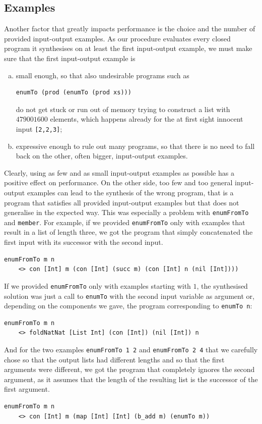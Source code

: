 \subsection{Examples}
Another factor that greatly impacts performance is the choice and the number of provided input-output examples. As our procedure evaluates every closed program it synthesises on at least the first input-output example, we must make sure that the first input-output example is
\begin{enumerate}[a.]
\item small enough, so that also undesirable programs such as 
\begin{lstlisting}[style=plain]
enumTo (prod (enumTo (prod xs)))
\end{lstlisting}
do not get stuck or run out of memory trying to construct a list with $479001600$ elements, which happens already for the at first sight innocent input \lstinline?[2,2,3]?;
\item expressive enough to rule out many programs, so that there is no need to fall back on the other, often bigger, input-output examples.
\end{enumerate}
Clearly, using as few and as small input-output examples as possible has a positive effect on performance. On the other side, too few and too general input-output examples can lead to the synthesis of the wrong program, that is a program that satisfies all provided input-output examples but that does not generalise in the expected way. This was especially a problem with \lstinline?enumFromTo? and \lstinline?member?. For example, if we provided \lstinline?enumFromTo? only with examples that result in a list of length three, we got the program that simply concatenated the first input with its successor with the second input.
\begin{lstlisting}[style=plain]
enumFromTo m n
    <> con [Int] m (con [Int] (succ m) (con [Int] n (nil [Int])))
\end{lstlisting}
If we provided \lstinline?enumFromTo? only with examples starting with $1$, the synthesised solution was just a call to \lstinline?enumTo? with the second input variable as argument or, depending on the components we gave, the program corresponding to \lstinline?enumTo n?:
\begin{lstlisting}[style=plain]
enumFromTo m n
    <> foldNatNat [List Int] (con [Int]) (nil [Int]) n
\end{lstlisting}
And for the two examples \lstinline?enumFromTo 1 2? and \lstinline?enumFromTo 2 4? that we carefully chose so that the output lists had different lengths and so that the first arguments were different, we got the program that completely ignores the second argument, as it assumes that the length of the resulting list is the successor of the first argument.
\begin{lstlisting}[style=plain]
enumFromTo m n
    <> con [Int] m (map [Int] [Int] (b_add m) (enumTo m))
\end{lstlisting}

